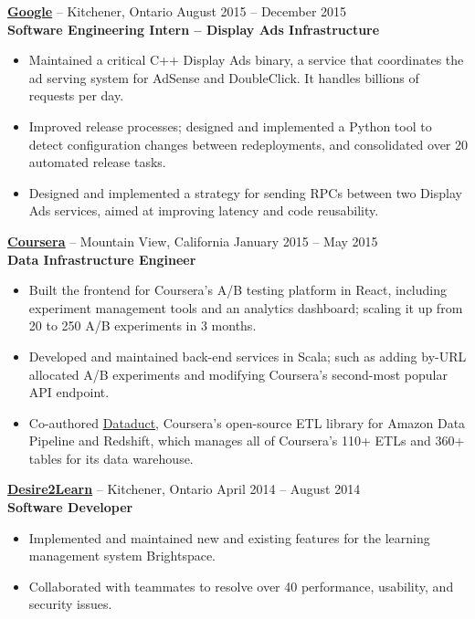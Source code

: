 \documentclass{letter}
\begin{document}
\vspace{-1.5mm}
{\bfseries \href{https://www.google.com}{\uline{Google}}} -- Kitchener, Ontario \hfill August 2015 -- December 2015\\
{\bfseries Software Engineering Intern -- Display Ads Infrastructure}
\vspace{-3mm}
\begin{itemize}
    \item Maintained a critical C++ Display Ads binary, a service that
      coordinates the ad serving system for AdSense and DoubleClick. It handles
      billions of requests per day.
    \item Improved release processes; designed and implemented a Python tool to
        detect configuration changes between redeployments, and consolidated
        over 20 automated release tasks.
    \item Designed and implemented a strategy for sending RPCs between two
      Display Ads services, aimed at improving latency and code reusability.
\end{itemize}

\vspace{-1.5mm}
{\bfseries \href{https://www.coursera.org}{\uline{Coursera}}} -- Mountain View, California \hfill January 2015 -- May 2015 \\
{\bfseries Data Infrastructure Engineer}
\vspace{-3mm}
\begin{itemize}
    \item Built the frontend for Coursera's A/B testing platform in React, including
      experiment management tools and an analytics dashboard; scaling it up from 20 to
      250 A/B experiments in 3 months.
    \item Developed and maintained back-end services in Scala; such as adding
      by-URL allocated A/B experiments and modifying Coursera's second-most
      popular API endpoint.
    \item Co-authored \href{https://github.com/coursera/dataduct}{\uline{Dataduct}},
      Coursera's open-source ETL library for Amazon Data Pipeline and
      Redshift, which manages all of Coursera's 110+ ETLs and 360+ tables for its data warehouse.
\end{itemize}

\vspace{-1.5mm}
{\bfseries \href{http://www.d2l.com}{\uline{Desire2Learn}}} -- Kitchener, Ontario \hfill April 2014 -- August 2014 \\
{\bfseries Software Developer}
\vspace{-3mm}
\begin{itemize}
    \item Implemented and maintained new and existing features for the learning
      management system Brightspace.
    \item Collaborated with teammates to resolve over 40 performance, usability, and security issues.
\end{itemize}
\end{document}
